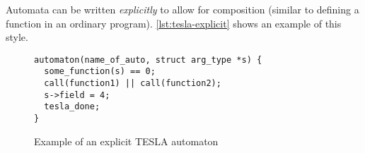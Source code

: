 Automata can be written \emph{explicitly} to allow for composition
(similar to defining a function in an ordinary program).
\autoref{lst:tesla-explicit} shows an example of this style.

\begin{figure}[ht]
  \begin{verbatim}
automaton(name_of_auto, struct arg_type *s) {
  some_function(s) == 0;
  call(function1) || call(function2);
  s->field = 4;
  tesla_done;
}
  \end{verbatim}
  \caption{Example of an explicit TESLA automaton}
  \label{lst:tesla-explicit}
\end{figure}
